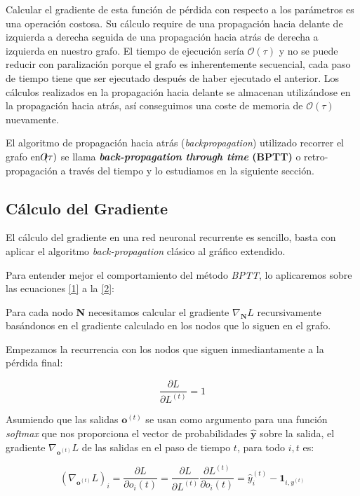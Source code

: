 	Calcular el gradiente de esta función de pérdida con respecto a los parámetros es una operación costosa. Su cálculo require de una propagación hacia delante de izquierda a derecha seguida de una propagación hacia atrás de derecha a izquierda en nuestro grafo. El tiempo de ejecución sería $\mathcal{O}(\tau)$ y no se puede reducir con paralización porque el grafo es inherentemente secuencial, cada paso de tiempo tiene que ser ejecutado después de haber ejecutado el anterior. Los cálculos realizados en la propagación hacia delante se almacenan utilizándose en la propagación hacia atrás, así conseguimos una coste de memoria de $\mathcal{O}(\tau)$ nuevamente.  
	
	El algoritmo de propagación hacia atrás (\textit{backpropagation}) utilizado recorrer el grafo en $\mathclap{O}(\tau)$ se llama \textbf{\textit{back-propagation through time} (BPTT)} o retro-propagación a través del tiempo y lo estudiamos en la siguiente sección.
	
	\subsection{Cálculo del Gradiente}
	 
	El cálculo del gradiente en una red neuronal recurrente es sencillo, basta con aplicar el algoritmo \textit{back-propagation} clásico al gráfico extendido. 
	
	Para entender mejor el comportamiento del método \textit{BPTT}, lo aplicaremos sobre las ecuaciones \ref{1} a la \ref{2}:
	
	Para cada nodo \textbf{N} necesitamos calcular el gradiente $\nabla_{\textbf{N}}L$ recursivamente basándonos en el gradiente calculado en los nodos que lo siguen en el grafo.
	
	Empezamos la recurrencia con los nodos que siguen inmediantamente a la pérdida final:
	
	\begin{equation}
		\frac{\partial L}{ \partial L^{(t)}} = 1
	\end{equation}
	
	Asumiendo que las salidas $\textbf{o}^{(t)}$ se usan como argumento para una función \textit{softmax} que nos proporciona el vector de probabilidades $\hat{\textbf{y}}$ sobre la salida, el gradiente $\nabla_{\textbf{o}^{(t)}}L$ de las salidas en el paso de tiempo $t$, para todo $i,t$ es:
	
	\begin{equation}
		(\nabla_{\textbf{o}^{(t)}}L)_i = \frac{\partial L}{\partial o_i{(t)}} = \frac{\partial L}{\partial L^{(t)}}\frac{\partial L^{(t)}}{\partial o_i{(t)}} = \hat{y}_i^{(t)} - \textbf{1}_{i,y^{(t)}}
	\end{equation}
	
